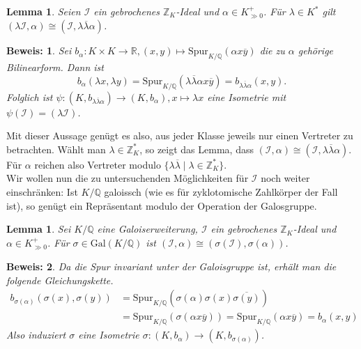 \documentclass[12pt,a4paper,halfparskip,headsepline,bibtotocnumbered]{scrreprt}
\theoremstyle{nummermitklammern}
\newtheorem{lemma}[defsatzusw]{Lemma}
\theoremstyle{nonumberbreak}
\newtheorem{beweis}{Beweis:}
\newcommand{\Z}{\mathbb{Z}}
\newcommand{\Q}{\mathbb{Q}}
\newcommand{\R}{\mathbb{R}}
\newcommand{\I}{\mathcal{I}}
\begin{document}
\begin{framed}
	\begin{lemma}\label{lem:squares}
		Seien $\I$ ein gebrochenes $\Z_K$-Ideal und $\alpha \in K^+_{\gg 0}$. Für $\lambda \in K^\ast$ gilt $(\lambda \I, \alpha) \cong (\I, \lambda \overline{\lambda}\alpha)$.
	\end{lemma}
\end{framed}

\begin{beweis}
	Sei $b_\alpha : K \times K \rightarrow \R, (x,y) \mapsto \text{Spur}_{K/\Q} (\alpha x \overline{y})$ die zu $\alpha$ gehörige Bilinearform. Dann ist
	\begin{equation*}
		b_\alpha(\lambda x, \lambda y) = \text{Spur}_{K/\Q} (\lambda \overline{\lambda} \alpha x \overline{y}) = b_{\lambda \overline{\lambda} \alpha} (x,y).
	\end{equation*}
	Folglich ist $\psi : (K, b_{\lambda \overline{\lambda }\alpha}) \rightarrow (K, b_\alpha), x \mapsto \lambda x$ eine Isometrie mit $\psi(\I) = (\lambda \I)$.
\end{beweis}

Mit dieser Aussage genügt es also, aus jeder Klasse jeweils nur einen Vertreter zu betrachten. Wählt man $\lambda \in \Z_K^\ast$, so zeigt das Lemma, dass $(\I, \alpha) \cong (\I, \lambda \overline{\lambda} \alpha)$. Für $\alpha$ reichen also Vertreter modulo $\lbrace \lambda \overline{\lambda} \mid \lambda \in \Z_K^\ast \rbrace$.\\
Wir wollen nun die zu untersuchenden Möglichkeiten für $\I$ noch weiter einschränken: Ist $K / \Q$ galoissch (wie es für zyklotomische Zahlkörper der Fall ist), so genügt ein Repräsentant modulo der Operation der Galosgruppe.

\begin{framed}
	\begin{lemma}
		Sei $K / \Q$ eine Galoiserweiterung, $\I$ ein gebrochenes $\Z_K$-Ideal und $\alpha \in K^+_{\gg 0}$. Für $\sigma \in \text{Gal}(K/\Q)$ ist $(\I, \alpha) \cong \left( \sigma(\I), \sigma(\alpha) \right)$.
	\end{lemma}
\end{framed}

\begin{beweis}
	Da die Spur invariant unter der Galoisgruppe ist, erhält man die folgende Gleichungskette.
	\begin{align*}
		b_{\sigma(\alpha)} (\sigma(x), \sigma(y)) &= \text{Spur}_{K/\Q} \left( \sigma(\alpha) \sigma(x) \overline{\sigma(y)}\right)\\
		&= \text{Spur}_{K/\Q} \left( \sigma\left( \alpha x \overline{y} \right) \right) = \text{Spur}_{K/\Q} \left( \alpha x \overline{y} \right) = b_\alpha (x,y)
	\end{align*}
	Also induziert $\sigma$ eine Isometrie $\sigma : (K, b_\alpha) \rightarrow (K, b_{\sigma(\alpha)})$.
\end{beweis}
\end{document}
